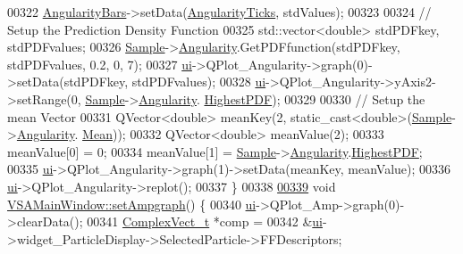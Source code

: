 \begin{DoxyCode}
{00322   \hyperlink{class_v_s_a_main_window_ac4dc27e6a351ad60f434357aeac9f1c0}{AngularityBars}->setData(\hyperlink{class_v_s_a_main_window_ab3adb6772a4766285b7b96e0fb407f62}{AngularityTicks}, stdValues);
00323 
00324   \textcolor{comment}{// Setup the Prediction Density Function}
00325   std::vector<double> stdPDFkey, stdPDFvalues;
00326   \hyperlink{class_v_s_a_main_window_a09d2f0c3ef8247e9c46932f866cab132}{Sample}->\hyperlink{class_soil_analyzer_1_1_sample_aac706ea1206fea6b708227c88481081d}{Angularity}.GetPDFfunction(stdPDFkey, stdPDFvalues, 0.2, 0, 7);
00327   \hyperlink{class_v_s_a_main_window_a958a0581d2bf1bfe020c3b5d8f738640}{ui}->QPlot\_Angularity->graph(0)->setData(stdPDFkey, stdPDFvalues);
00328   \hyperlink{class_v_s_a_main_window_a958a0581d2bf1bfe020c3b5d8f738640}{ui}->QPlot\_Angularity->yAxis2->setRange(0, \hyperlink{class_v_s_a_main_window_a09d2f0c3ef8247e9c46932f866cab132}{Sample}->\hyperlink{class_soil_analyzer_1_1_sample_aac706ea1206fea6b708227c88481081d}{Angularity}.
      \hyperlink{class_soil_math_1_1_stats_a85da0692f7d25c9d5add1f8ffd67bdf2}{HighestPDF});
00329 
00330   \textcolor{comment}{// Setup the mean Vector}
00331   QVector<double> meanKey(2, static\_cast<double>(\hyperlink{class_v_s_a_main_window_a09d2f0c3ef8247e9c46932f866cab132}{Sample}->\hyperlink{class_soil_analyzer_1_1_sample_aac706ea1206fea6b708227c88481081d}{Angularity}.
      \hyperlink{class_soil_math_1_1_stats_a6f53982d52cf492ddd4df9b56bd014e7}{Mean}));
00332   QVector<double> meanValue(2);
00333   meanValue[0] = 0;
00334   meanValue[1] = \hyperlink{class_v_s_a_main_window_a09d2f0c3ef8247e9c46932f866cab132}{Sample}->\hyperlink{class_soil_analyzer_1_1_sample_aac706ea1206fea6b708227c88481081d}{Angularity}.\hyperlink{class_soil_math_1_1_stats_a85da0692f7d25c9d5add1f8ffd67bdf2}{HighestPDF};
00335   \hyperlink{class_v_s_a_main_window_a958a0581d2bf1bfe020c3b5d8f738640}{ui}->QPlot\_Angularity->graph(1)->setData(meanKey, meanValue);
00336   \hyperlink{class_v_s_a_main_window_a958a0581d2bf1bfe020c3b5d8f738640}{ui}->QPlot\_Angularity->replot();
00337 \}
00338 
\hypertarget{vsamainwindow_8cpp_source_l00339}{}\hyperlink{class_v_s_a_main_window_a4de6c895ab070a8e4a9a858b819a7d1c}{00339} \textcolor{keywordtype}{void} \hyperlink{class_v_s_a_main_window_a4de6c895ab070a8e4a9a858b819a7d1c}{VSAMainWindow::setAmpgraph}() \{
00340   \hyperlink{class_v_s_a_main_window_a958a0581d2bf1bfe020c3b5d8f738640}{ui}->QPlot\_Amp->graph(0)->clearData();
00341   \hyperlink{_soil_math_types_8h_a7567e521c2b2c408dcb62dbff72390f7}{ComplexVect\_t} *comp =
00342       &\hyperlink{class_v_s_a_main_window_a958a0581d2bf1bfe020c3b5d8f738640}{ui}->widget\_ParticleDisplay->SelectedParticle->FFDescriptors;
}
\end{DoxyCode}
